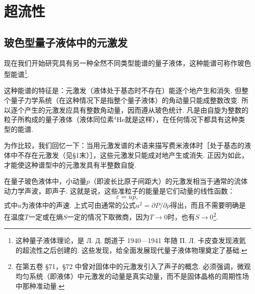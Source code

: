 \chapter{超流性}

\section{玻色型量子液体中的元激发}

现在我们开始研究具有另一种全然不同类型能谱的量子液体，这种能谱可称作玻色型能谱\footnote{这种量子液体理论，是 Л. Д. 朗道于 1940—1941 年随 П. Л. 卡皮查发现液氦的超流性之后创建的. 这些发现，给全面发展现代量子液体物理奠定了基础.}.

这种能谱的特征是：元激发（液体处于基态时不存在）能逐个地产生和消失. 但整个量子力学系统（在这种情况下是指整个量子液体）的角动量只能成整数改变. 所以逐个产生的元激发应具有整数角动量，因而遵从玻色统计. 凡是由自旋为整数的粒子所构成的量子液体（液体同位素$^{4}\mathrm{He}$就是这样），在任何情况下都具有这种类型的能谱.

为作比较，我们回忆一下：当用元激发谱的术语来描写费米液体时［处于基态的液体中不存在元激发（见§1末）］，这些元激发只能成对地产生或消失. 正因为如此，才能使这种谱型中的元激发具有半整数自旋.

在量子玻色液体中，小动量$p$（即波长比原子间距大）的元激发相当于通常的流体动力学声波，即声子. 这就是说，这些准粒子的能量是它们动量的线性函数：
\begin{equation}
\varepsilon = up,
\label{22.1}
\end{equation}
式中$u$为液体中的声速. 上式可由通常的公式$u^{2}=\partial P/\partial\rho$得出，而且不需要明确是在温度$T$一定或在熵$S$一定的情况下取微商，因为$T\to 0$时，也有$S\to 0$\footnote{在第五卷 §71，§72 中曾对固体中的元激发引入了声子的概念. 必须强调，微观均匀系统（即液体）中元激发的动量是真实动量，而不是固体晶格的周期性场中那种准动量.}.

